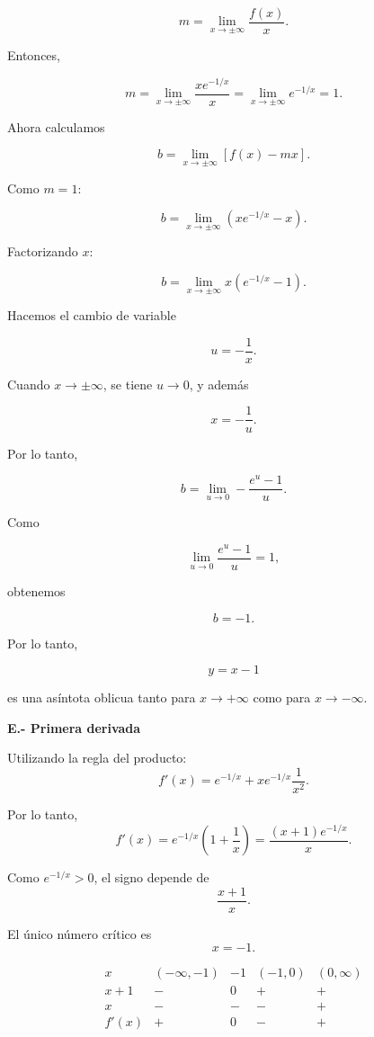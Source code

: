 \documentclass[12pt]{article}
\begin{document}
\begin{enumerate}[label=\alph*.-]
\[
m=
\lim_{x\to\pm\infty}
\frac{f(x)}{x}.
\]

Entonces,

\[
m=
\lim_{x\to\pm\infty}
\frac{xe^{-1/x}}{x}
=
\lim_{x\to\pm\infty}
e^{-1/x}
=
1.
\]

Ahora calculamos

\[
b=
\lim_{x\to\pm\infty}
\left[f(x)-mx\right].
\]

Como $m=1$:

\[
b=
\lim_{x\to\pm\infty}
\left(xe^{-1/x}-x\right).
\]

Factorizando $x$:

\[
b=
\lim_{x\to\pm\infty}
x\left(e^{-1/x}-1\right).
\]

Hacemos el cambio de variable

\[
u=-\frac{1}{x}.
\]

Cuando $x\to\pm\infty$, se tiene $u\to0$, y además

\[
x=-\frac{1}{u}.
\]

Por lo tanto,

\[
b=
\lim_{u\to0}
-\frac{e^u-1}{u}.
\]

Como

\[
\lim_{u\to0}
\frac{e^u-1}{u}=1,
\]

obtenemos

\[
b=-1.
\]

Por lo tanto,

\[
\boxed{y=x-1}
\]

es una asíntota oblicua tanto para $x\to+\infty$
como para $x\to-\infty$.

    \textbf{E.- Primera derivada}

    Utilizando la regla del producto:
    \[
    f'(x)
    =
    e^{-1/x}
    +
    x e^{-1/x}\frac{1}{x^2}.
    \]

    Por lo tanto,
    \[
    f'(x)
    =
    e^{-1/x}\left(1+\frac1x\right)
    =
    \frac{(x+1)e^{-1/x}}{x}.
    \]

    Como $e^{-1/x}>0$, el signo depende de
    \[
    \frac{x+1}{x}.
    \]

    El único número crítico es
    \[
    x=-1.
    \]

\[
\begin{array}{c|cccc}
x & (-\infty,-1) & -1 & (-1,0) & (0,\infty)\\
\hline
x+1 & - & 0 & + & +\\
x & - & - & - & +\\
\hline
f'(x) & + & 0 & - & +
\end{array}
\]


\end{enumerate}
\end{document}
